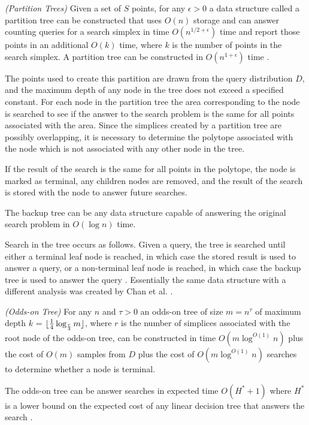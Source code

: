 \documentclass[mcs]{scsthesis}
\begin{document}
\begin{thm} \emph{(Partition Trees)} 
Given a set of \(S\) points, for any \(\epsilon > 0\) a data structure called
a partition tree can be constructed that uses \(O(n)\) storage and can answer
counting queries for a search simplex in time \(O(n^{1/2 + \epsilon})\) time and
report those points in an additional \(O(k)\) time, where \(k\) is the number
of points in the search simplex. A partition tree can be constructed in
\(O(n^{1 + \epsilon})\) time \cite{dutch}.
\end{thm}

The points used to create this partition are drawn from the query distribution
\(D\), and the maximum depth of any node in the tree does not exceed a specified
constant. For each node in the partition tree the area corresponding to the node
is searched to see if the answer to the search problem is the same for all points
associated with the area. Since the simplices created by a partition tree are
possibly overlapping, it is necessary to determine the polytope associated with
the node which is not associated with any other node in the tree.

If the result of the search is the same for all points in the polytope, the node
is marked as terminal, any children nodes are removed, and the result of the
search is stored with the node to answer future searches.

The backup tree can be any data structure capable of answering the original
search problem in \(O(\log n)\) time.

Search in the tree occurs as follows. Given a query, the tree is searched until
either a terminal leaf node is reached, in which case the stored result is used
to answer a query, or a non-terminal leaf node is reached, in which case the
backup tree is used to answer the query \cite{oddson}. Essentially the same data
structure with a different analysis was created by Chan et al. \cite{chan}.

\begin{thm} \emph{(Odds-on Tree)}
For any \(n\) and \(\tau>0\) an odds-on tree of size \(m = n^\tau\) of maximum
depth \(k\) = \(\lfloor {1 \over 4} \log_{r \over 3} m \rfloor \), where \(r\)
is the number of simplices associated with the root node of the odds-on tree,
can be constructed in time \(O(m \log^{O(1)} n)\) plus the cost of \(O(m)\)
samples from \(D\) plus the cost of \(O(m \log^{O(1)} n)\) searches to determine
whether a node is terminal.

The odds-on tree can be answer searches in expected time \(O(H^* + 1)\) where
\(H^*\) is a lower bound on the expected cost of any linear decision tree
that answers the search \cite{oddson}.  
\end{thm}
\end{document}
